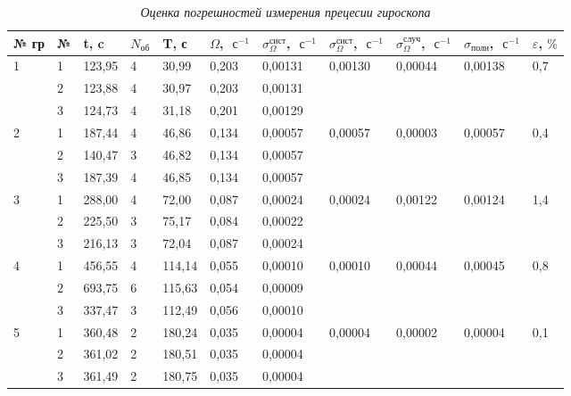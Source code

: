 \documentclass[a4paper,12pt]{article}
\begin{document}
\begin{table}[!h]
    \centering
    \begin{tabular}{|l|l|l|l|l|l|l|l|l|l|l|}
    \hline
        № гр & № & t, c & $N_\text{об}$ & T, с & $\Omega$, $\text{ с}^{-1}$ & $\sigma_\Omega^\text{сист}$, $\text{ с}^{-1}$ & $\sigma_\Omega^\text{сист}$, $\text{ с}^{-1}$ & $\sigma_\Omega^\text{случ}$, $\text{ с}^{-1}$ & $\sigma_\text{полн}$, $\text{ с}^{-1}$ & $\varepsilon$, $\%$ \\ \hline
        \multirow{3}{*}{1} & 1 & 123,95 & 4 & 30,99 & 0,203 & 0,00131 & \multirow{3}{*}{0,00130} & \multirow{3}{*}{0,00044} & \multirow{3}{*}{0,00138} & \multirow{3}{*}{0,7} \\ \cline{2-7}
        ~ & 2 & 123,88 & 4 & 30,97 & 0,203 & 0,00131 & ~ & ~ & ~ & ~ \\ \cline{2-7}
        ~ & 3 & 124,73 & 4 & 31,18 & 0,201 & 0,00129 & ~ & ~ & ~ & ~ \\ \hline
        \multirow{3}{*}{2} & 1 & 187,44 & 4 & 46,86 & 0,134 & 0,00057 & \multirow{3}{*}{0,00057} & \multirow{3}{*}{0,00003} & \multirow{3}{*}{0,00057} & \multirow{3}{*}{0,4} \\ \cline{2-7}
        ~ & 2 & 140,47 & 3 & 46,82 & 0,134 & 0,00057 & ~ & ~ & ~ & ~ \\ \cline{2-7}
        ~ & 3 & 187,39 & 4 & 46,85 & 0,134 & 0,00057 & ~ & ~ & ~ & ~ \\ \hline
        \multirow{3}{*}{3} & 1 & 288,00 & 4 & 72,00 & 0,087 & 0,00024 & \multirow{3}{*}{0,00024} & \multirow{3}{*}{0,00122} & \multirow{3}{*}{0,00124} & \multirow{3}{*}{1,4} \\ \cline{2-7}
        ~ & 2 & 225,50 & 3 & 75,17 & 0,084 & 0,00022 & ~ & ~ & ~ & ~ \\ \cline{2-7}
        ~ & 3 & 216,13 & 3 & 72,04 & 0,087 & 0,00024 & ~ & ~ & ~ & ~ \\ \hline
        \multirow{3}{*}{4} & 1 & 456,55 & 4 & 114,14 & 0,055 & 0,00010 & \multirow{3}{*}{0,00010} & \multirow{3}{*}{0,00044} & \multirow{3}{*}{0,00045} & \multirow{3}{*}{0,8} \\ \cline{2-7}
        ~ & 2 & 693,75 & 6 & 115,63 & 0,054 & 0,00009 & ~ & ~ & ~ & ~ \\ \cline{2-7}
        ~ & 3 & 337,47 & 3 & 112,49 & 0,056 & 0,00010 & ~ & ~ & ~ & ~ \\ \hline
        \multirow{3}{*}{5} & 1 & 360,48 & 2 & 180,24 & 0,035 & 0,00004 & \multirow{3}{*}{0,00004} & \multirow{3}{*}{0,00002} & \multirow{3}{*}{0,00004} & \multirow{3}{*}{0,1} \\ \cline{2-7}
        ~ & 2 & 361,02 & 2 & 180,51 & 0,035 & 0,00004 & ~ & ~ & ~ & ~ \\ \cline{2-7}
        ~ & 3 & 361,49 & 2 & 180,75 & 0,035 & 0,00004 & ~ & ~ & ~ & ~ \\ \hline
    \end{tabular}\caption{\textit{Оценка погрешностей измерения прецесии гироскопа}}\label{precession-error}
\end{table}
\end{document}
